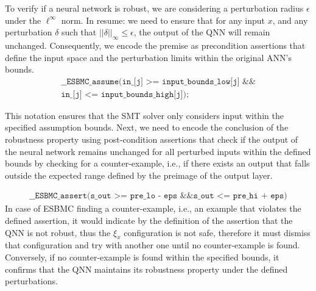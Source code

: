 To verify if a neural network is robust, we are considering a perturbation radius $\epsilon$ under the $\ell^\infty$ norm. In resume: we need to ensure that for any input $x$, and any perturbation $\delta$ such that $||\delta||_\infty \leq \epsilon$, the output of the QNN will remain unchanged. Consequently, we encode the premise as precondition assertions that define the input space and the perturbation limits within the original ANN's bounds. 
\begin{equation}
    \begin{aligned}
    \texttt{\_\_ESBMC\_assume(in\_[j] >= input\_bounds\_low[j] \&\&} \\
    \texttt{in\_[j] <= input\_bounds\_high[j]);}
    \end{aligned}
\end{equation}

This notation ensures that the SMT solver only considers input within the specified assumption bounds. Next, we need to encode the conclusion of the robustness property using post-condition assertions that check if the output of the neural network remains unchanged for all perturbed inputs within the defined bounds by checking for a counter-example, i.e., if there exists an output that falls outside the expected range defined by the preimage of the output layer.


\begin{equation}
    \begin{aligned}
    \texttt{\_\_ESBMC\_assert(s\_out >= pre\_lo - eps \&\& s\_out <= pre\_hi + eps)}
    \end{aligned}
\end{equation}
In case of ESBMC finding a counter-example, i.e., an example that violates the defined assertion, it would indicate by the definition of the assertion that the QNN is not robust, thus the $\xi _{x}$ configuration is not safe, therefore it must dismiss that configuration and try with another one until no counter-example is found. Conversely, if no counter-example is found within the specified bounds, it confirms that the QNN maintains its robustness property under the defined perturbations. 

